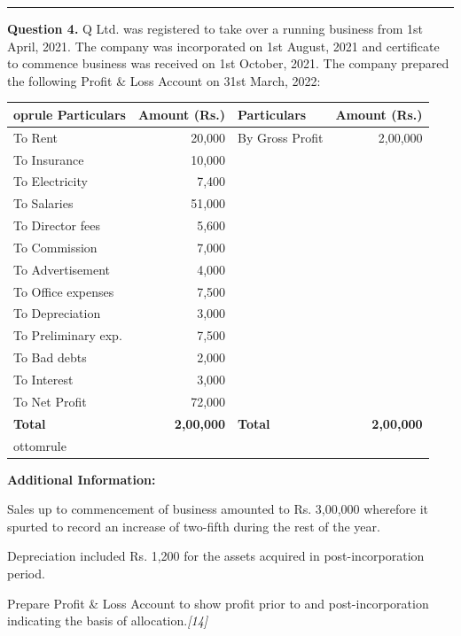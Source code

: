 \documentclass[11pt,a4paper]{article}
\newcommand{\pts}[1]{\hfill   \textit{[#1]}}
\begin{document}
\medskip\rule{\linewidth}{0.2pt}


\newpage




\noindent   \textbf{Question 4.}
Q Ltd. was registered to take over a running business from 1st April, 2021. The company was incorporated on 1st August, 2021 and certificate to commence business was received on 1st October, 2021. The company prepared the following Profit \& Loss Account on 31st March, 2022:

\begin{center}
  \small
  
\begin{tabular}{lr|lr}
     oprule
   \textbf{Particulars} &   \textbf{Amount (Rs.)} &   \textbf{Particulars} &   \textbf{Amount (Rs.)} \\
    \midrule
    To Rent & 20,000 & By Gross Profit & 2,00,000 \\
    To Insurance & 10,000 & & \\
    To Electricity & 7,400 & & \\
    To Salaries & 51,000 & & \\
    To Director fees & 5,600 & & \\
    To Commission & 7,000 & & \\
    To Advertisement & 4,000 & & \\
    To Office expenses & 7,500 & & \\
    To Depreciation & 3,000 & & \\
    To Preliminary exp. & 7,500 & & \\
    To Bad debts & 2,000 & & \\
    To Interest & 3,000 & & \\
    To Net Profit & 72,000 & & \\
    \midrule
   \textbf{Total} &   \textbf{2,00,000} &   \textbf{Total} &   \textbf{2,00,000} \\
    ottomrule
  \end{tabular}
\end{center}




\noindent   \textbf{Additional Information:}

\begin{parts}
  \item Sales up to commencement of business amounted to Rs. 3,00,000 wherefore it spurted to record an increase of two-fifth during the rest of the year.
  \item Depreciation included Rs. 1,200 for the assets acquired in post-incorporation period.
\end{parts}
Prepare Profit \& Loss Account to show profit prior to and post-incorporation indicating the basis of allocation.\pts{14}
\end{document}
